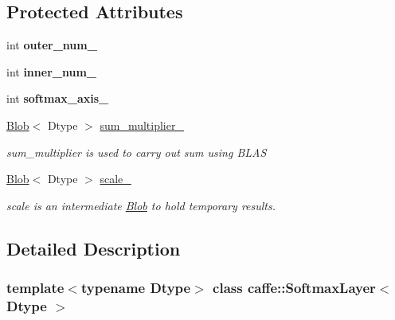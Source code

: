 \subsection*{Protected Attributes}
\begin{DoxyCompactItemize}
\item 
\mbox{\label{classcaffe_1_1_softmax_layer_abb41226ecdb5e1c5a89336c680186637}} 
int {\bfseries outer\+\_\+num\+\_\+}
\item 
\mbox{\label{classcaffe_1_1_softmax_layer_a05182b1721808e2706e54ad6d6462d0c}} 
int {\bfseries inner\+\_\+num\+\_\+}
\item 
\mbox{\label{classcaffe_1_1_softmax_layer_a48792959064b3d211e0ef48f1a429bc6}} 
int {\bfseries softmax\+\_\+axis\+\_\+}
\item 
\mbox{\label{classcaffe_1_1_softmax_layer_a333976c29222763b011accbb17fc277e}} 
\mbox{\hyperlink{classcaffe_1_1_blob}{Blob}}$<$ Dtype $>$ \mbox{\hyperlink{classcaffe_1_1_softmax_layer_a333976c29222763b011accbb17fc277e}{sum\+\_\+multiplier\+\_\+}}
\begin{DoxyCompactList}\small\item\em sum\+\_\+multiplier is used to carry out sum using B\+L\+AS \end{DoxyCompactList}\item 
\mbox{\label{classcaffe_1_1_softmax_layer_ab550eadc64bed0984cda8df852c4055a}} 
\mbox{\hyperlink{classcaffe_1_1_blob}{Blob}}$<$ Dtype $>$ \mbox{\hyperlink{classcaffe_1_1_softmax_layer_ab550eadc64bed0984cda8df852c4055a}{scale\+\_\+}}
\begin{DoxyCompactList}\small\item\em scale is an intermediate \mbox{\hyperlink{classcaffe_1_1_blob}{Blob}} to hold temporary results. \end{DoxyCompactList}\end{DoxyCompactItemize}


\subsection{Detailed Description}
\subsubsection*{template$<$typename Dtype$>$\newline
class caffe\+::\+Softmax\+Layer$<$ Dtype $>$}

